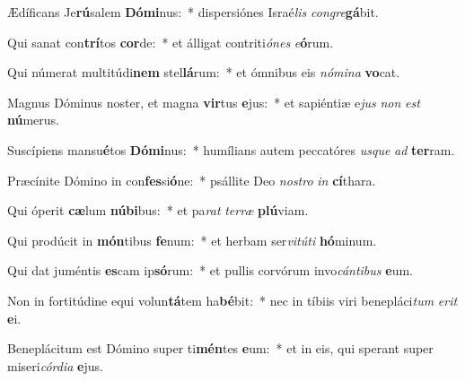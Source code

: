 \item Ædíficans Je\textbf{rú}salem \textbf{Dó}\textbf{mi}nus:~* dispersiónes Israé\textit{lis} \textit{con}\textit{gre}\textbf{gá}bit.
\item Qui sanat con\textbf{trí}tos \textbf{cor}de:~* et álligat contriti\textit{ó}\textit{nes} \textit{e}\textbf{ó}rum.
\item Qui númerat multitúdi\textbf{nem} stel\textbf{lá}rum:~* et ómnibus eis \textit{nó}\textit{mi}\textit{na} \textbf{vo}cat.
\item Magnus Dóminus noster, et magna \textbf{vir}tus \textbf{e}jus:~* et sapiéntiæ e\textit{jus} \textit{non} \textit{est} \textbf{nú}merus.
\item Suscípiens mansu\textbf{é}tos \textbf{Dó}\textbf{mi}nus:~* humílians autem peccatóres \textit{us}\textit{que} \textit{ad} \textbf{ter}ram.
\item Præcínite Dómino in con\textbf{fes}si\textbf{ó}ne:~* psállite Deo \textit{nos}\textit{tro} \textit{in} \textbf{cí}thara.
\item Qui óperit \textbf{cæ}lum \textbf{nú}\textbf{bi}bus:~* et pa\textit{rat} \textit{ter}\textit{ræ} \textbf{plú}viam.
\item Qui prodúcit in \textbf{món}tibus \textbf{fe}num:~* et herbam ser\textit{vi}\textit{tú}\textit{ti} \textbf{hó}minum.
\item Qui dat juméntis \textbf{es}cam ip\textbf{só}rum:~* et pullis corvórum invo\textit{cán}\textit{ti}\textit{bus} \textbf{e}um.
\item Non in fortitúdine equi volun\textbf{tá}tem ha\textbf{bé}bit:~* nec in tíbiis viri benepláci\textit{tum} \textit{e}\textit{rit} \textbf{e}i.
\item Beneplácitum est Dómino super ti\textbf{mén}tes \textbf{e}um:~* et in eis, qui sperant super miseri\textit{cór}\textit{di}\textit{a} \textbf{e}jus.
